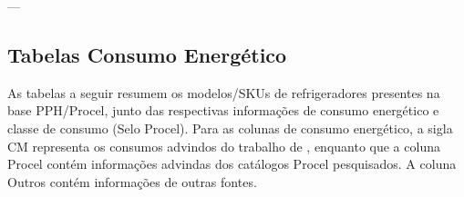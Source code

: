 \documentclass[
	12pt,				%
	openright,			%
	oneside,			%
	a4paper,			%
	english,			%
	french,				%
	spanish,			%
	brazil,				%
	]{abntex2}
\begin{document}


	\postextual


	



	---
	\begin{apendicesenv}

	\partapendices

	\chapter{Tabelas Consumo Energético}

		As tabelas a seguir resumem os modelos/SKUs de refrigeradores presentes na base PPH/Procel, junto das respectivas informações de consumo energético e classe de consumo (Selo Procel). Para as colunas de consumo energético, a sigla CM representa os consumos advindos do trabalho de , enquanto que a coluna Procel contém informações advindas dos catálogos Procel pesquisados. A coluna Outros contém informações de outras fontes.
	\end{apendicesenv}



\end{document}
